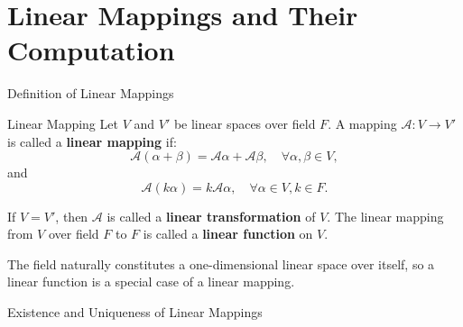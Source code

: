 \documentclass[11pt]{../../TexTemplate/elegantbook} %
\begin{document}
\section{Linear Mappings and Their Computation}
\begin{leftbarTitle}{Definition of Linear Mappings}\end{leftbarTitle}
\begin{definition}{Linear Mapping}
    Let \( V \) and \( V' \) be linear spaces over field \( F \).
    A mapping \( \mathcal{A}: V \to V' \) is called a \textbf{linear mapping} if:
    \[
    \mathcal{A}(\alpha + \beta) = \mathcal{A}\alpha + \mathcal{A}\beta, \quad \forall \alpha, \beta \in V,
    \]
    and
    \[
    \mathcal{A}(k\alpha) = k\mathcal{A}\alpha, \quad \forall \alpha \in V, k \in F.
    \]

    If \( V = V' \), then \( \mathcal{A} \) is called a \textbf{linear transformation} of \( V \).
    The linear mapping from \( V \) over field \( F \) to \(F\) is called a \textbf{linear function} on \( V \).
\end{definition}

\begin{remark}
    The field naturally constitutes a one-dimensional linear space over itself, 
    so a linear function is a special case of a linear mapping.
\end{remark}




\begin{leftbarTitle}{Existence and Uniqueness of Linear Mappings}\end{leftbarTitle}
\end{document}
